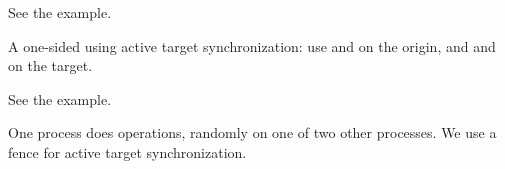 
See the  example.


A one-sided  using active target synchronization:
use  and 
on the origin, and  and
 on the target.
%


See the  example.


One process does  operations, randomly on one of
two other processes. We use a fence for active target synchronization.
%
